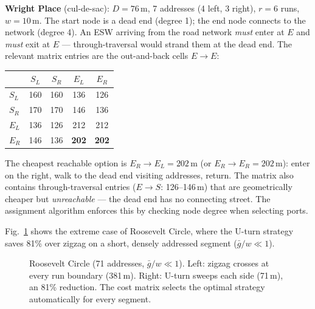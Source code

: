 \documentclass[conference]{IEEEtran}
\begin{document}
\textbf{Wright Place} (cul-de-sac): $D = 76$\,m, 7 addresses (4 left, 3 right), $r = 6$ runs, $w = 10$\,m. The start node is a dead end (degree 1); the end node connects to the network (degree 4). An ESW arriving from the road network \emph{must} enter at $E$ and \emph{must} exit at $E$ --- through-traversal would strand them at the dead end. The relevant matrix entries are the out-and-back cells $E \to E$:

\begin{center}
\begin{tabular}{l|cccc}
    & $S_L$ & $S_R$ & $E_L$ & $E_R$ \\
\hline
$S_L$  & 160  & 160  & 136  & 126 \\
$S_R$  & 170  & 170  & 146  & 136 \\
$E_L$  & 136  & 126  & 212  & 212 \\
$E_R$  & 146  & 136  & \textbf{202}  & \textbf{202}
\end{tabular}
\end{center}

The cheapest reachable option is $E_R \to E_L = 202$\,m (or $E_R \to E_R = 202$\,m): enter on the right, walk to the dead end visiting addresses, return. The matrix also contains through-traversal entries ($E \to S$: 126--146\,m) that are geometrically cheaper but \emph{unreachable} --- the dead end has no connecting street. The assignment algorithm enforces this by checking node degree when selecting ports.

Fig.~\ref{fig:uturn-path} shows the extreme case of Roosevelt Circle, where the U-turn strategy saves 81\% over zigzag on a short, densely addressed segment ($\bar{g}/w \ll 1$).

\begin{figure}[htbp]
\centering
{}
\caption{Roosevelt Circle (71 addresses, $\bar{g}/w \ll 1$). Left: zigzag crosses at every run boundary (381\,m). Right: U-turn sweeps each side (71\,m), an 81\% reduction. The cost matrix selects the optimal strategy automatically for every segment.}
\label{fig:uturn-path}
\end{figure}
\end{document}
